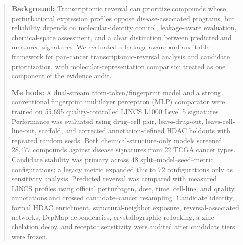 
\begin{abstract}
\begin{roundtworevision}
\textbf{Background:} Transcriptomic reversal can prioritize compounds whose perturbational expression profiles oppose disease-associated programs, but reliability depends on molecular-identity control, leakage-aware evaluation, chemical-space assessment, and a clear distinction between predicted and measured signatures. We evaluated a leakage-aware and auditable framework for pan-cancer transcriptomic-reversal analysis and candidate prioritization, with molecular-representation comparison treated as one component of the evidence audit.

\textbf{Methods:} A dual-stream atom-token/fingerprint model and a strong conventional fingerprint multilayer perceptron (MLP) comparator were trained on 55,695 quality-controlled LINCS L1000 Level 5 signatures. Performance was evaluated using drug--cell pair, leave-drug-out, leave-cell-line-out, scaffold, and corrected annotation-defined HDAC holdouts with repeated random seeds. Both chemical-structure-only models screened 28,477 compounds against disease signatures from 22 TCGA cancer types. Candidate stability was primary across 48 split--model--seed--metric configurations; a legacy metric expanded this to 72 configurations only as sensitivity analysis. Predicted reversal was compared with measured LINCS profiles using official perturbagen, dose, time, cell-line, and quality annotations and crossed candidate--cancer resampling. Candidate identity, formal HDAC enrichment, structural-neighbor exposure, reversal-associated networks, DepMap dependencies, crystallographic redocking, a zinc-chelation decoy, and receptor sensitivity were audited after candidate tiers were frozen.


\end{roundtworevision}
\end{abstract}

